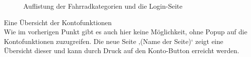 \begin{figure}[H]
\begin{center}
\caption{Auflistung der Fahrradkategorien und die Login-Seite}
\end{center}
\end{figure}

Eine Übersicht der Kontofunktionen
\\
Wie im vorherigen Punkt gibt es auch hier keine Möglichkeit, ohne Popup auf die Kontofunktionen zuzugreifen. Die neue Seite ‚(Name der Seite)‘ zeigt eine Übersicht dieser und kann durch Druck auf den Konto-Button erreicht werden.

